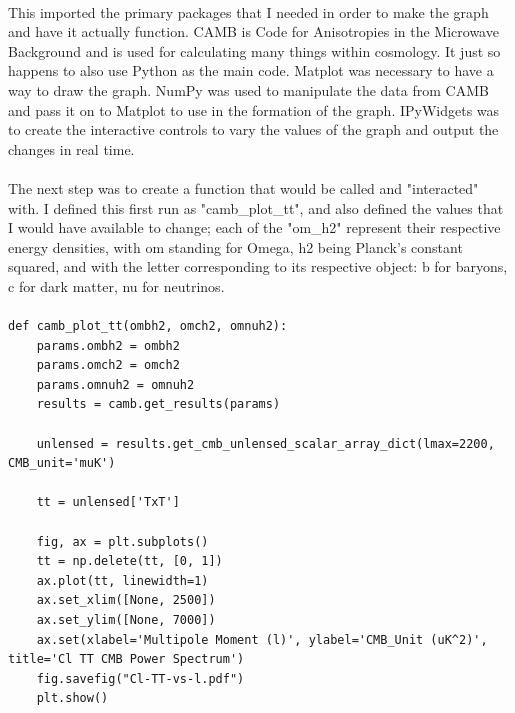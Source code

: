 \documentclass[twoside, fontsize=12pt,
     bibliography=totoc, %
     listof=totoc, %
     index=totoc, %
     onehalfspacing %
]{_MScDiss2017_cls}
\begin{document}
\paragraph{}
This imported the primary packages that I needed in order to make the graph and have it actually function. CAMB is Code for Anisotropies in the Microwave Background and is used for calculating many things within cosmology. It just so happens to also use Python as the main code. Matplot was necessary to have a way to draw the graph. NumPy was used to manipulate the data from CAMB and pass it on to Matplot to use in the formation of the graph. IPyWidgets was to create the interactive controls to vary the values of the graph and output the changes in real time.

\paragraph{}

The next step was to create a function that would be called and "interacted" with. I defined this first run as "camb\_plot\_tt", and also defined the values that I would have available to change; each of the "om\_h2" represent their respective energy densities, with om standing for Omega, h2 being Planck's constant squared, and with the letter corresponding to its respective object: b for baryons, c for dark matter, nu for neutrinos.

\paragraph{}

\begin{lstfloat}
\begin{lstlisting}[caption={Initialising the first plot}, captionpos=b]
%matplotlib inline
def camb_plot_tt(ombh2, omch2, omnuh2):
    params.ombh2 = ombh2
    params.omch2 = omch2
    params.omnuh2 = omnuh2
    results = camb.get_results(params)

    unlensed = results.get_cmb_unlensed_scalar_array_dict(lmax=2200, CMB_unit='muK')

    tt = unlensed['TxT']

    fig, ax = plt.subplots()
    tt = np.delete(tt, [0, 1])
    ax.plot(tt, linewidth=1)
    ax.set_xlim([None, 2500])
    ax.set_ylim([None, 7000])
    ax.set(xlabel='Multipole Moment (l)', ylabel='CMB_Unit (uK^2)', title='Cl TT CMB Power Spectrum')
    fig.savefig("Cl-TT-vs-l.pdf")
    plt.show()

\end{lstlisting}
\end{lstfloat}
\end{document}
